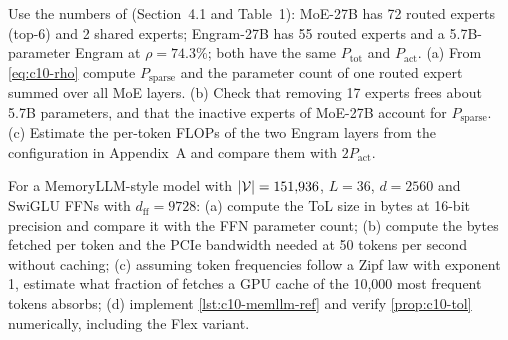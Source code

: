 \begin{exercise}\label{exr:c10-alloc}
Use the numbers of  (Section~4.1 and Table~1):
MoE-27B has 72 routed experts (top-6) and 2 shared experts; Engram-27B has 55 routed experts and a
5.7B-parameter Engram at $\rho = 74.3\%$; both have the same $P_{\mathrm{tot}}$ and
$P_{\mathrm{act}}$. (a) From \cref{eq:c10-rho} compute $P_{\mathrm{sparse}}$ and the parameter
count of one routed expert summed over all MoE layers. (b) Check that removing 17 experts frees about
5.7B parameters, and that the inactive experts of MoE-27B account for $P_{\mathrm{sparse}}$.
(c) Estimate the per-token FLOPs of the two Engram layers from the configuration in Appendix~A and
compare them with $2 P_{\mathrm{act}}$.
\end{exercise}

\begin{exercise}\label{exr:c10-tol}
For a MemoryLLM-style model with $\left\lvert \mathcal{V}\right\rvert = 151{,}936$, $L = 36$, $d = 2560$ and SwiGLU
FFNs with $d_{\mathrm{ff}} = 9728$: (a) compute the ToL size in bytes at 16-bit precision and compare
it with the FFN parameter count; (b) compute the bytes fetched per token and the PCIe bandwidth
needed at 50 tokens per second without caching; (c) assuming token frequencies follow a Zipf law
with exponent 1, estimate what fraction of fetches a GPU cache of the 10{,}000 most frequent tokens
absorbs; (d) implement \cref{lst:c10-memllm-ref} and verify \cref{prop:c10-tol} numerically,
including the Flex variant.
\end{exercise}
